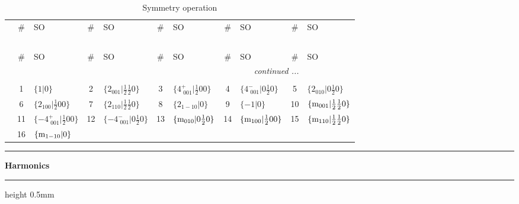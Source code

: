 \documentclass[fleqn,10pt,landscape]{jsarticle}
\begin{document}
\renewcommand{\arraystretch}{1.6}
\begin{longtable}[l]{c|cl|cl|cl|cl|cl}
\captionsetup{justification=raggedright, singlelinecheck=off}
\caption{Symmetry operation}
 \\
 \hline \hline
 & \# & SO & \# & SO & \# & SO & \# & SO & \# & SO \\ \hline \endfirsthead

\multicolumn{10}{l}{\tablename\ \thetable{}} \\
 \hline \hline
 & \# & SO & \# & SO & \# & SO & \# & SO & \# & SO \\ \hline \endhead

 \hline \hline
\multicolumn{10}{r}{\footnotesize\it continued ...} \\ \endfoot

 \hline \hline
\multicolumn{10}{r}{} \\ \endlastfoot

 & 1 & $\{1|0\}$ & 2 & $\{2{}_{001}|\frac{1}{2} \frac{1}{2} 0\}$ & 3 & $\{4^{+}_{\,\,001}|\frac{1}{2} 0 0\}$ & 4 & $\{4^{-}_{\,\,001}|0 \frac{1}{2} 0\}$ & 5 & $\{2{}_{010}|0 \frac{1}{2} 0\}$ \\
& 6 & $\{2{}_{100}|\frac{1}{2} 0 0\}$ & 7 & $\{2{}_{110}|\frac{1}{2} \frac{1}{2} 0\}$ & 8 & $\{2{}_{1-10}|0\}$ & 9 & $\{-1|0\}$ & 10 & $\{{\rm m}_{001}|\frac{1}{2} \frac{1}{2} 0\}$ \\
& 11 & $\{-4^{+}_{\,\,001}|\frac{1}{2} 0 0\}$ & 12 & $\{-4^{-}_{\,\,001}|0 \frac{1}{2} 0\}$ & 13 & $\{{\rm m}_{010}|0 \frac{1}{2} 0\}$ & 14 & $\{{\rm m}_{100}|\frac{1}{2} 0 0\}$ & 15 & $\{{\rm m}_{110}|\frac{1}{2} \frac{1}{2} 0\}$ \\
& 16 & $\{{\rm m}_{1-10}|0\}$ &  &  &  &  &  &  &  &  \\
\end{longtable}
\vspace{5mm}
\noindent \rule[0.5mm]{5mm}{0.5mm}\hspace{3mm}\textbf{Harmonics}\hspace{3mm}\leaders\hrule height 0.5mm\hfill\kern0pt
\vspace{3mm}
\end{document}
